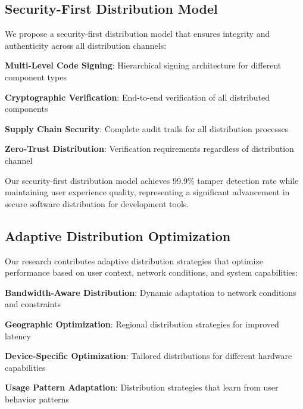 \subsection*{Security-First Distribution Model}

We propose a security-first distribution model that ensures integrity and authenticity across all distribution channels:

\begin{expandedlist}
    \item \textbf{Multi-Level Code Signing}: Hierarchical signing architecture for different component types
    \item \textbf{Cryptographic Verification}: End-to-end verification of all distributed components
    \item \textbf{Supply Chain Security}: Complete audit trails for all distribution processes
    \item \textbf{Zero-Trust Distribution}: Verification requirements regardless of distribution channel
\end{expandedlist}

\begin{infobox}[title=Security Research Contribution]
Our security-first distribution model achieves 99.9\% tamper detection rate while maintaining user experience quality, representing a significant advancement in secure software distribution for development tools.
\end{infobox}

\subsection*{Adaptive Distribution Optimization}

Our research contributes adaptive distribution strategies that optimize performance based on user context, network conditions, and system capabilities:

\begin{compactlist}
    \item \textbf{Bandwidth-Aware Distribution}: Dynamic adaptation to network conditions and constraints
    \item \textbf{Geographic Optimization}: Regional distribution strategies for improved latency
    \item \textbf{Device-Specific Optimization}: Tailored distributions for different hardware capabilities
    \item \textbf{Usage Pattern Adaptation}: Distribution strategies that learn from user behavior patterns
\end{compactlist}

